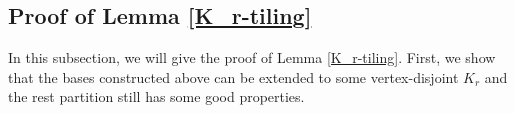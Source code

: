 \documentclass[11pt, a4paper]{article}
\theoremstyle{definition}
\newcommand{\<}{\subseteq}
\begin{document}



\subsection{Proof of Lemma \ref{K_r-tiling}}\label{section7.2}

In this subsection, we will give the proof of Lemma \ref{K_r-tiling}. First, we show that the bases constructed above can be extended to some vertex-disjoint $K_r$ and the rest partition still has some good properties. 
\end{document}
